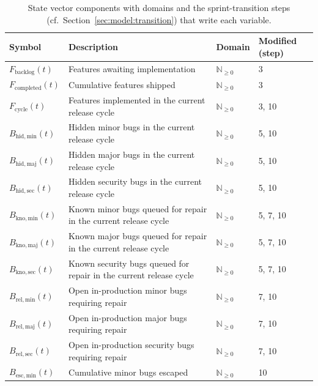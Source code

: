 \documentclass[smallextended]{svjour3}       %
\begin{document}
\begin{table}[t]
\caption{State vector components with domains and the sprint-transition
  steps (cf.\ Section~\ref{sec:model:transition}) that write each variable.}
\label{tab:state}
\footnotesize
\begin{tabularx}{\linewidth}{p{2.3cm}Xp{1.5cm}p{1.4cm}}
\toprule
Symbol & Description & Domain & Modified (step) \\
\midrule
$F_\mathrm{backlog}(t)$     & Features awaiting implementation                      & $\mathbb{N}_{\geq 0}$  & 3 \\[2pt]
$F_\mathrm{completed}(t)$   & Cumulative features shipped            & $\mathbb{N}_{\geq 0}$  & 3 \\[2pt]
$F_\mathrm{cycle}(t)$       & Features implemented in the current release cycle & $\mathbb{N}_{\geq 0}$  & 3, 10 \\[2pt]
\midrule
$B_\mathrm{hid,min}(t)$     & Hidden minor bugs in the current release cycle           & $\mathbb{N}_{\geq 0}$  & 5, 10 \\[2pt]
$B_\mathrm{hid,maj}(t)$     & Hidden major bugs in the current release cycle          & $\mathbb{N}_{\geq 0}$  & 5, 10 \\[2pt]
$B_\mathrm{hid,sec}(t)$     & Hidden security bugs in the current release cycle        & $\mathbb{N}_{\geq 0}$  & 5, 10 \\[2pt]
$B_\mathrm{kno,min}(t)$     & Known minor bugs queued for repair in the current release cycle & $\mathbb{N}_{\geq 0}$  & 5, 7, 10 \\[2pt]
$B_\mathrm{kno,maj}(t)$     & Known major bugs queued for repair in the current release cycle & $\mathbb{N}_{\geq 0}$  & 5, 7, 10 \\[2pt]
$B_\mathrm{kno,sec}(t)$     & Known security bugs queued for repair in the current release cycle & $\mathbb{N}_{\geq 0}$ & 5, 7, 10 \\[2pt]
$B_\mathrm{rel,min}(t)$     & Open in-production minor bugs requiring repair              & $\mathbb{N}_{\geq 0}$  & 7, 10 \\[2pt]
$B_\mathrm{rel,maj}(t)$     & Open in-production major bugs requiring repair              & $\mathbb{N}_{\geq 0}$  & 7, 10 \\[2pt]
$B_\mathrm{rel,sec}(t)$     & Open in-production security bugs requiring repair           & $\mathbb{N}_{\geq 0}$  & 7, 10 \\[2pt]
$B_\mathrm{esc,min}(t)$     & Cumulative minor bugs escaped              & $\mathbb{N}_{\geq 0}$  & 10 \\[2pt]

\end{tabularx}
\end{table}
\end{document}
